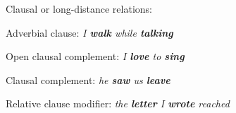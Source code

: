 












Clausal or long-distance relations:
\squishlist
	\item Adverbial clause: \emph{ I \textbf{walk} while \textbf{talking}}
	\item Open clausal complement:  \emph{I \textbf{love} to \textbf{sing} }
	\item  Clausal complement:  \emph{ he \textbf{saw} us \textbf{leave}}
	\item  Relative clause modifier:  \emph{the \textbf{letter} I \textbf{wrote} reached }
\squishend


